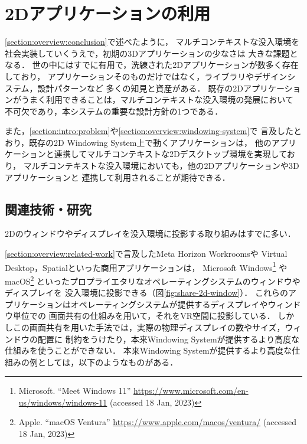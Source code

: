 \chapter{2Dアプリケーションの利用}
\label{chapter:2d}


\ref{section:overview:conclusion}で述べたように，
マルチコンテキストな没入環境を社会実装していくうえで，初期の3Dアプリケーションの少なさは
大きな課題となる．
世の中にはすでに有用で，洗練された2Dアプリケーションが数多く存在しており，
アプリケーションそのものだけではなく，ライブラリやデザインシステム，設計パターンなど
多くの知見と資産がある．
既存の2Dアプリケーションがうまく利用できることは，マルチコンテキストな没入環境の発展において
不可欠であり，本システムの重要な設計方針の1つである．

また，\ref{section:intro:problem}や\ref{section:overview:windowing-system}で
言及したとおり，既存の2D Windowing System上で動くアプリケーションは，
他のアプリケーションと連携してマルチコンテキストな2Dデスクトップ環境を実現しており，
マルチコンテキストな没入環境においても，他の2Dアプリケーションや3Dアプリケーションと
連携して利用されることが期待できる．

\section{関連技術・研究}


2Dのウィンドウやディスプレイを没入環境に投影する取り組みはすでに多い．

\ref{section:overview:related-work}で言及したMeta Horizon Workroomsや
Virtual Desktop，Spatialといった商用アプリケーションは，
Microsoft Windows\footnote{Microsoft. ``Meet Windows 11'' \url{https://www.microsoft.com/en-us/windows/windows-11} (accessed 18 Jan, 2023)}
やmacOS\footnote{Apple. ``macOS Ventura'' \url{https://www.apple.com/macos/ventura/} (accessed 18 Jan, 2023)}
といったプロプライエタリなオペレーティングシステムのウィンドウやディスプレイを
没入環境に投影できる（図\ref{fig:share-2d-window}）．
これらのアプリケーションはオペレーティングシステムが提供するディスプレイやウィンドウ単位での
画面共有の仕組みを用いて，それをVR空間に投影している．
しかしこの画面共有を用いた手法では，実際の物理ディスプレイの数やサイズ，ウィンドウの配置に
制約をうけたり，本来Windowing Systemが提供するより高度な仕組みを使うことができない．
本来Windowing Systemが提供するより高度な仕組みの例としては，以下のようなものがある．

